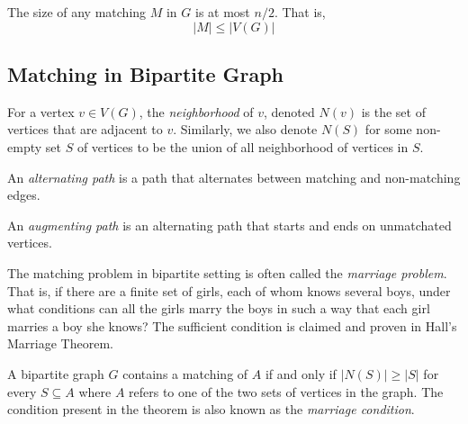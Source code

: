 \begin{remark}
  The size of any matching \(M\) in \(G\) is at most \(n/2\). That is,
  \[ |M| \leq |V(G)| \]
\end{remark}

\subsection{Matching in Bipartite Graph}

\begin{definition}[Neighborhood]
  For a vertex \(v \in V(G)\), the \textit{neighborhood} of \(v\), denoted
  \(N(v)\) is the set of vertices that are adjacent to \(v\).
  Similarly, we also denote \(N(S)\) for some non-empty set \(S\) of
  vertices to be the union of all neighborhood of vertices in \(S\).
\end{definition}

\begin{definition}
  An \textit{alternating path} is a path that alternates between matching and
  non-matching edges.
\end{definition}

\begin{definition}
  An \textit{augmenting path} is an alternating path that starts and ends on
  unmatchated vertices.
\end{definition}

The matching problem in bipartite setting is often called the \textit{marriage
problem}. That is, if there are a finite set of girls, each of whom knows
several boys, under what conditions can all the girls marry the boys in such a
way that each girl marries a boy she knows? The sufficient condition is claimed
and proven in Hall's Marriage Theorem.

\begin{theorem}
  A bipartite graph \(G\) contains a matching of \(A\) if and only if \(|N(S)|
  \geq |S|\) for every \(S \subseteq A\) where \(A\) refers to one of the two
  sets of vertices in the graph. The condition present in the theorem is also 
  known as the \textit{marriage condition}.
\end{theorem}

